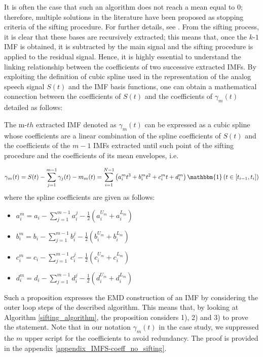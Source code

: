 It is often the case that such an algorithm does not reach a mean equal to 0; therefore, multiple solutions in the literature have been proposed as stopping criteria of the sifting procedure. For further details, see \cite{Machine}. From the sifting process, it is clear that these bases are recursively extracted; this means that, once the $k$-$1$ IMF is obtained, it is subtracted by the main signal and the sifting procedure is applied to the residual signal. Hence, it is highly essential to understand the linking relationship between the coefficients of two successive extracted IMFs. 
By exploiting the definition of cubic spline used in the representation of the analog speech signal $S(t)$ and the IMF basis functions, one can obtain a mathematical connection between the coefficients of $S(t)$ and the coefficients of $\gamma_m(t)$ detailed as follows: 

\begin{Proposition}
\label{prop_cs}
The m-$th$ extracted IMF denoted as $\gamma_m(t)$ can be expressed as a cubic spline whose coefficients are a linear combination of the spline coefficients of $S(t)$ and the coefficients of the $m-1$ IMFs extracted until such point of the sifting procedure and the coefficients of its mean envelopes, i.e.

\begin{equation}
\gamma_m(t) = S(t) - \sum_{j=1}^{m-1} \gamma_j(t) - m_{m}(t) = \sum_{i=1}^{N-1} \left( a_i^m t^3 + b_i^m t^2 + c_i^m t + d_i^m \right) \mathbbm{1} \left( t \in \left[ t_{i-1}, t_i \right] \right)
\end{equation}
where the spline coefficients are given as follows:
\begin{multicols}{2}
\begin{itemize}
\item $a_i^m = a_i - \sum_{j=1}^{m-1} a_i^j - \frac{1}{2} ( a_i^{U_m} + a_i^{L_m}) $
\item $b_i^m = b_i - \sum_{j=1}^{m-1} b_i^j - \frac{1}{2}( b_i^{U_m} + b_i^{L_m}) $
\item $c_i^m = c_i - \sum_{j=1}^{m-1} c_i^j - \frac{1}{2} ( c_i^{U_m} + c_i^{L_m}) $
\item $d_i^m = d_i - \sum_{j=1}^{m-1} d_i^j - \frac{1}{2} ( d_i^{U_m} + d_i^{L_m}) $
\end{itemize}
\end{multicols}
\end{Proposition}

Such a proposition expresses the EMD construction of an IMF by considering the outer loop steps of the described algorithm. This means that, by looking at Algorithm \ref{sifting_algorithm}, the proposition considers 1), 2) and 3) to prove the statement. Note that in our notation $\gamma_m(t)$ in the case study, we suppressed the $m$ upper script for the coefficients to avoid redundancy. The proof is provided in the appendix \ref{appendix_IMFS-coeff_no_sifting}.
